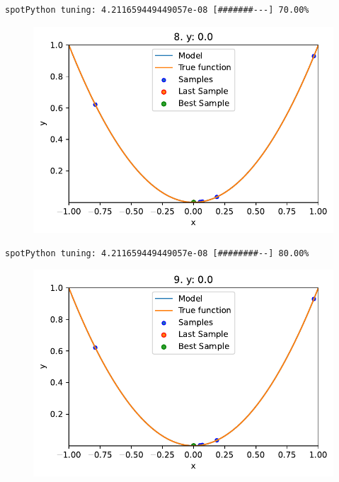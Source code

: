 \documentclass[
  letterpaper,
  DIV=11,
  numbers=noendperiod]{scrreprt}
\begin{document}
\begin{verbatim}
spotPython tuning: 4.211659449449057e-08 [#######---] 70.00% 
\end{verbatim}

\begin{figure}[H]

{\centering \includegraphics{010_num_spot_sklearn_surrogate_files/figure-pdf/cell-25-output-10.pdf}

}

\end{figure}

\begin{verbatim}
spotPython tuning: 4.211659449449057e-08 [########--] 80.00% 
\end{verbatim}

\begin{figure}[H]

{\centering \includegraphics{010_num_spot_sklearn_surrogate_files/figure-pdf/cell-25-output-12.pdf}

}

\end{figure}
\end{document}
